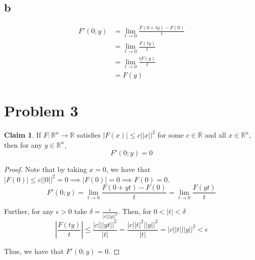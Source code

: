 \documentclass[12pt,letterpaper]{article}
\theoremstyle{definition}
\newtheorem*{claim}{Claim}
\newcommand{\R}{\mathbb{R}}
\begin{document}
\subsection*{b}

\begin{align*}
  F'(0; y) &= \lim_{t\rightarrow 0}\frac{F(0 + ty) - F(0)}{t} \\
           &= \lim_{t\rightarrow 0}\frac{F(ty)}{t} \\
           &= \lim_{t\rightarrow 0}\frac{tF(y)}{t} \\
           &= F(y)
\end{align*}

\section*{Problem 3}

\begin{claim}
  If $F: \R^n \rightarrow \R$ satisfies $|F(x)| \leq c||x||^2$ for some $c \in
  \R$ and all $x \in \R^n$, then for any $y \in \R^n$,
  \[
    F'(0; y) = 0
  \]
\end{claim}

\begin{proof}
  Note that by taking $x = 0$, we have that $|F(0)| \leq c||0||^2 = 0 \implies
  |F(0)| =  0 \implies F(0) = 0$.
  \[
    F'(0; y) = \lim_{t\rightarrow 0}\frac{F(0 + yt) - F(0)}{t} =
    \lim_{t\rightarrow 0}\frac{F(yt)}{t}
  \]

  Further, for any $\epsilon > 0$ take $\delta = \frac{\epsilon}{|c|||y||^2}$.
  Then, for $0 < |t| < \delta$
  \[
    \left|\frac{F(ty)}{t}\right| \leq \frac{|c|||yt||^2}{|t|} = \frac{|c||t|^2||y||^2}{|t|}
    = |c||t|||y||^2 < \epsilon
  \]

  Thus, we have that $F'(0; y) = 0$.

\end{proof}
\end{document}
